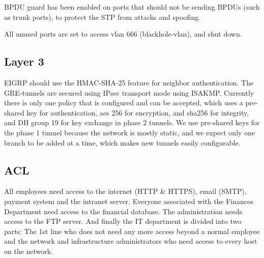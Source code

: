 BPDU guard has been enabled on ports that should not be sending BPDUs (such as trunk ports), to protect the STP from attacks and spoofing.


All unused ports are set to access vlan 666 (blackhole-vlan), and shut down.

\subsection{Layer 3}
EIGRP should use the HMAC-SHA-25 feature for neighbor authentication. 
The GRE-tunnels are secured using IPsec transport mode using ISAKMP. Currently there is only one policy that is configured and can be accepted, which uses a pre-shared key for authentication, aes 256 for encryption, and sha256 for integrity, and DH group 19 for key exchange in phase 2 tunnels. We use pre-shared keys for the phase 1 tunnel because the network is mostly static, and we expect only one branch to be added at a time, which makes new tunnels easily configurable.


\subsection{ACL}
All employees need access to the internet (HTTP \& HTTPS), email (SMTP), payment system and the intranet server.
Everyone associated with the Finances Department need access to the financial database. 
The administration needs access to the FTP server.
And finally the IT department is divided into two parts: The 1st line who does not need any more access beyond a normal employee and the network and infrastructure administrators who need access to every host on the network.

